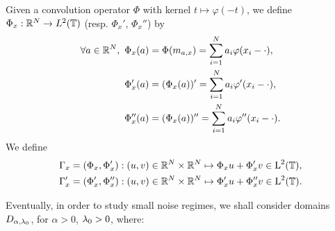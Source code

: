 Given a convolution operator $\Phi$ with kernel $t\mapsto \varphi(-t)$, we define $\Phi_x : \mathbb{R}^N \rightarrow L^2(\mathbb{T})$ (resp. $\Phi_x'$, $\Phi_x''$) by
\begin{align}\label{eq-notation-Phix}
\forall a\in \RR^N,\	\Phi_x(a) &= \Phi( m_{a,x} ) = \sum_{i=1}^N a_i \phi(x_i - \cdot), \\
	\Phi'_x(a) &= (\Phi_x(a))' = \sum_{i=1}^N a_i \phi'(x_i - \cdot), \\
	{\Phi''_x}(a) &= (\Phi_x(a))'' = \sum_{i=1}^N a_i \phi''(x_i - \cdot).
\end{align}
We define 
\begin{align}\label{eq-gammax}
	\Gamma_x &= (\Phi_x, \Phi_x') : (u,v) \in \mathbb{R}^N \times \mathbb{R}^N \mapsto \Phi_x u + \Phi'_x v \in \text{\upshape L}^2(\mathbb{T}), \\
	\Gamma_x'&= (\Phi'_x, \Phi''_x): (u,v) \in \mathbb{R}^N \times \mathbb{R}^N \mapsto \Phi_x' u + \Phi''_x v \in \text{\upshape L}^2(\mathbb{T}). 
\end{align}

Eventually, in order to study small noise regimes, we shall consider domains $D_{\alpha,\lambda_0}$, for $\alpha>0$, $\lambda_0>0$, where:

